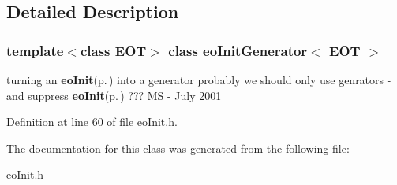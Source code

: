 \subsection{Detailed Description}
\subsubsection*{template$<$class EOT$>$ class eo\-Init\-Generator$<$ EOT $>$}

turning an {\bf eo\-Init}{\rm (p.\,\pageref{classeo_init})} into a generator probably we should only use genrators - and suppress {\bf eo\-Init}{\rm (p.\,\pageref{classeo_init})} ??? MS - July 2001 



Definition at line 60 of file eo\-Init.h.

The documentation for this class was generated from the following file:\begin{CompactItemize}
\item 
eo\-Init.h\end{CompactItemize}
